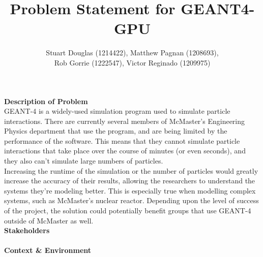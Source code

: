 \documentclass[12pt]{article}
\begin{document}
\title{Problem Statement for GEANT4-GPU} 
\author{Stuart Douglas (1214422), Matthew Pagnan (1208693),
		\\ Rob Gorrie (1222547), Victor Reginado (1209975)}
	
\maketitle


\noindent
\textbf{Description of Problem}\\
GEANT-4 is a widely-used simulation program used to simulate particle
interactions. There are currently several members of McMaster's Engineering
Physics department that use the program, and are being limited by the 
performance of the software. This means that they cannot simulate particle 
interactions that take place over the course of minutes (or even seconds), and 
they also can't simulate large numbers of particles.\\

\noindent
Increasing the runtime of the simulation or the number of particles would greatly increase the accuracy of their results, allowing the researchers to understand the systems they're modeling better. This is especially true when modelling complex systems, such as McMaster's nuclear reactor. Depending upon the level of success of the project, the solution could potentially benefit groups that use GEANT-4 outside of McMaster as well.\\

\noindent
\textbf{Stakeholders}\\
\\

\noindent
\textbf{Context \& Environment}\\
\\
\end{document}
